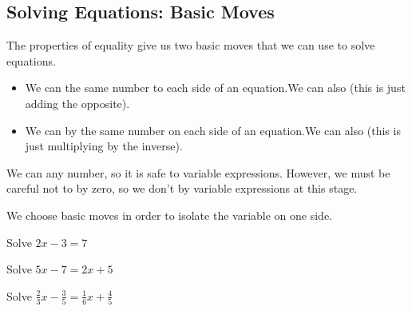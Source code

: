 \subsection{Solving Equations: Basic Moves} 
The properties of equality give us two basic moves that we can use to solve equations.
\begin{itemize}
\item We can \makeblank[1in] the same number to each side of an equation.\lbr We can also \makeblank[1.5in] (this is just adding the opposite).
\item We can \makeblank[1.5in] by the same number on each side of an equation.\lbr We can also \makeblank[1.5in] (this is just multiplying by the inverse).
\end{itemize}
\begin{Note}
We can \makeblank[1in] any number, so it is safe to \makeblank[1in] variable expressions. However, we must be careful not to \makeblank[2in] by zero, so we don't \makeblank[2in] by variable expressions at this stage.
\end{Note}
We choose basic moves in order to isolate the variable on one side.
\begin{Example}
Solve $2x-3=7$
\end{Example}
\begin{Example}
Solve $5x-7=2x+5$
\end{Example}
\begin{Example}
Solve $\frac{2}{3}x-\frac{3}{5}=\frac{1}{6}x+\frac{4}{5}$
\end{Example}